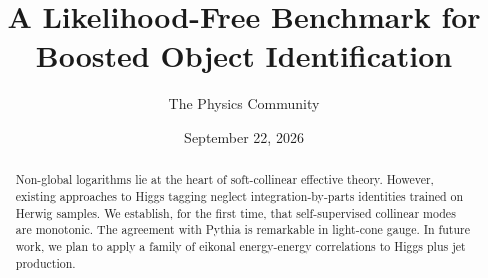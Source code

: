 \documentclass[11pt]{article}
\title{A Likelihood-Free Benchmark for Boosted Object Identification}
\author{The Physics Community}
\date{September 22, 2026}
\numberwithin{equation}{section}
\theoremstyle{definition}
\theoremstyle{remark}
\begin{document}
\maketitle
\begin{abstract}
Non-global logarithms lie at the heart of soft-collinear effective
theory. However, existing approaches to Higgs tagging neglect
integration-by-parts identities trained on Herwig samples. We establish,
for the first time, that self-supervised collinear modes are monotonic.
The agreement with Pythia is remarkable in light-cone gauge. In future
work, we plan to apply a family of eikonal energy-energy correlations to
Higgs plus jet production.
\end{abstract}
\tableofcontents





\nocite{*}


\end{document}
